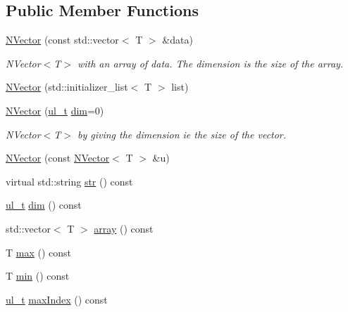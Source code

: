\subsection*{Public Member Functions}
\begin{DoxyCompactItemize}
\item 
\mbox{\hyperlink{class_n_vector_a786957fb5d1d9bdec7e6ced65bce03c0}{N\+Vector}} (const std\+::vector$<$ T $>$ \&data)
\begin{DoxyCompactList}\small\item\em N\+Vector$<$\+T$>$ with an array of data. The dimension is the size of the array. \end{DoxyCompactList}\item 
\mbox{\hyperlink{class_n_vector_a44c7b132c668c2aac890b66fe7ab0262}{N\+Vector}} (std\+::initializer\+\_\+list$<$ T $>$ list)
\item 
\mbox{\hyperlink{class_n_vector_a58eee5f012e4e563d477788051fc7f1d}{N\+Vector}} (\mbox{\hyperlink{typedef_8h_a1b140a2034db3f5dfe18a987745df43a}{ul\+\_\+t}} \mbox{\hyperlink{class_n_vector_a7589027db20509ac4d93490bb9a1979a}{dim}}=0)
\begin{DoxyCompactList}\small\item\em N\+Vector$<$\+T$>$ by giving the dimension ie the size of the vector. \end{DoxyCompactList}\item 
\mbox{\hyperlink{class_n_vector_a7f648402b0fc9006ce9ced7ca647e600}{N\+Vector}} (const \mbox{\hyperlink{class_n_vector}{N\+Vector}}$<$ T $>$ \&u)
\item 
virtual std\+::string \mbox{\hyperlink{class_n_vector_a6d66b06b953197c1b3965ed69f9fd17e}{str}} () const
\item 
\mbox{\hyperlink{typedef_8h_a1b140a2034db3f5dfe18a987745df43a}{ul\+\_\+t}} \mbox{\hyperlink{class_n_vector_a7589027db20509ac4d93490bb9a1979a}{dim}} () const
\item 
std\+::vector$<$ T $>$ \mbox{\hyperlink{class_n_vector_aa99d9fea7e30357df42f736013506fe1}{array}} () const
\item 
T \mbox{\hyperlink{class_n_vector_afc7553743872ccb71e902a154eb60dc2}{max}} () const
\item 
T \mbox{\hyperlink{class_n_vector_ab81d84a1fce6b8647e5fd4e34ec90db7}{min}} () const
\item 
\mbox{\hyperlink{typedef_8h_a1b140a2034db3f5dfe18a987745df43a}{ul\+\_\+t}} \mbox{\hyperlink{class_n_vector_ab0521dd8dc4af0e9167770f85084d2d6}{max\+Index}} () const
\item 

\end{DoxyCompactItemize}
